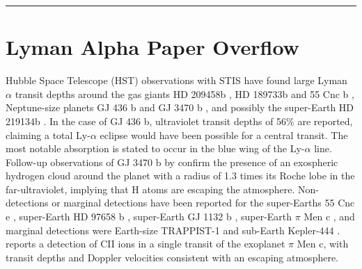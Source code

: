 \documentclass[onecolumn]{aastex63}
\begin{document}
\vspace{1cm}
\hrule
\vspace{1cm}

\section{Lyman Alpha Paper Overflow}
Hubble Space Telescope (HST) observations with STIS have found large Lyman $\alpha$ transit depths around the gas giants HD 209458b \citep{2003Natur.422..143V}, HD 189733b \citep{2012A&A...543L...4L} and 55 Cnc b \citep{2012A&A...547A..18E}, Neptune-size planets GJ 436 b
\citep{2015Natur.522..459E}
and GJ 3470 b \citep{2018A&A...620A.147B}, and possibly the super-Earth HD 219134b \citep{2019EPSC...13.1928L}. In the case of GJ 436 b, ultraviolet transit depths of 56\% are reported, claiming a total Ly-$\alpha$ eclipse would have been possible for a central transit. The most notable absorption is stated to occur in the blue wing of the Ly-$\alpha$ line. Follow-up observations of GJ 3470 b by \citet{2021arXiv210309864B} confirm the presence of an exospheric hydrogen cloud around the planet with a radius of 1.3 times its Roche lobe in the far-ultraviolet, implying that H atoms are escaping the atmosphere. 
Non-detections or marginal detections have been reported for the super-Earths 55 Cnc e \citep{2012A&A...547A..18E}, super-Earth HD 97658 b \citep{2017A&A...597A..26B} , super-Earth GJ 1132 b \citep{2019AJ....158...50W}, super-Earth $\pi$ Men c \citep{2020ApJ...888L..21G}, and marginal detections were Earth-size TRAPPIST-1 \citep{2017A&A...599L...3B} and sub-Earth Kepler-444 \citep{2017A&A...602A.106B}.  \cite{2021ApJ...907L..36M} reports a detection of CII ions in a single transit of the exoplanet $\pi$ Men c, with transit depths and Doppler velocities consistent with an escaping atmosphere.
\end{document}
